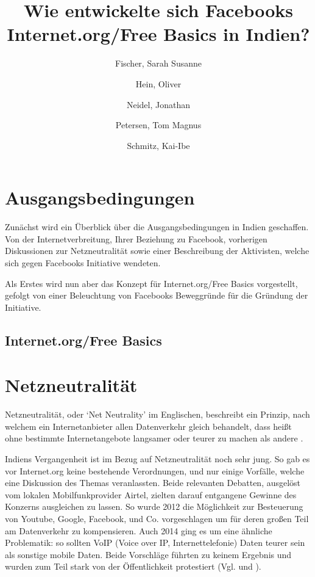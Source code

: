 \documentclass{article}
\title{Wie entwickelte sich Facebooks Internet.org/Free Basics in Indien?}
\author{
  Fischer, Sarah Susanne\\
  \and
  Hein, Oliver\\
  \and
  Neidel, Jonathan\\
  \and
  Petersen, Tom Magnus\\
  \and
  Schmitz, Kai-Ibe\\
}
\begin{document}
\maketitle

\section{Ausgangsbedingungen}

Zunächst wird ein Überblick über die Ausgangsbedingungen in Indien geschaffen. Von der Internetverbreitung, Ihrer Beziehung zu Facebook, vorherigen Diskussionen zur Netzneutralität sowie einer Beschreibung der Aktivisten, welche sich gegen Facebooks Initiative wendeten.

Als Erstes wird nun aber das Konzept für Internet.org/Free Basics vorgestellt, gefolgt von einer Beleuchtung von Facebooks Beweggründe für die Gründung der Initiative.

\subsection{Internet.org/Free Basics}

\section{Netzneutralität}

Netzneutralität, oder `Net Neutrality' im Englischen, beschreibt ein Prinzip, nach welchem ein Internetanbieter allen Datenverkehr gleich behandelt, dass heißt ohne bestimmte Internetangebote langsamer oder teurer zu machen als andere \autocite{netzneutralität}.

\medskip

Indiens Vergangenheit ist im Bezug auf Netzneutralität noch sehr jung. So gab es vor Internet.org keine bestehende Verordnungen, und nur einige Vorfälle, welche eine Diskussion des Themas veranlassten.
Beide relevanten Debatten, ausgelöst vom lokalen Mobilfunkprovider Airtel, zielten darauf entgangene Gewinne des Konzerns ausgleichen zu lassen.
So wurde 2012 die Möglichkeit zur Besteuerung von Youtube, Google, Facebook, und Co. vorgeschlagen um für deren großen Teil am Datenverkehr zu kompensieren.
Auch 2014 ging es um eine ähnliche Problematik: so sollten VoIP (Voice over IP, Internettelefonie) Daten teurer sein als sonstige mobile Daten.
Beide Vorschläge führten zu keinem Ergebnis und wurden zum Teil stark von der Öffentlichkeit protestiert (Vgl. \textcite[253]{everydayLife} und \textcite{airtelVoip}).
\end{document}
